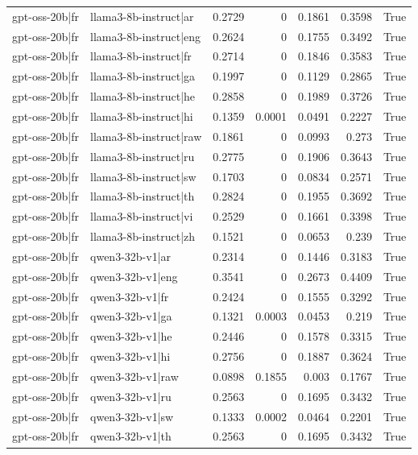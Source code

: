 \begin{table}
\begin{tabular}{l l r r r r l}
gpt-oss-20b|fr & llama3-8b-instruct|ar & 0.2729 & 0 & 0.1861 & 0.3598 & True \\
gpt-oss-20b|fr & llama3-8b-instruct|eng & 0.2624 & 0 & 0.1755 & 0.3492 & True \\
gpt-oss-20b|fr & llama3-8b-instruct|fr & 0.2714 & 0 & 0.1846 & 0.3583 & True \\
gpt-oss-20b|fr & llama3-8b-instruct|ga & 0.1997 & 0 & 0.1129 & 0.2865 & True \\
gpt-oss-20b|fr & llama3-8b-instruct|he & 0.2858 & 0 & 0.1989 & 0.3726 & True \\
gpt-oss-20b|fr & llama3-8b-instruct|hi & 0.1359 & 0.0001 & 0.0491 & 0.2227 & True \\
gpt-oss-20b|fr & llama3-8b-instruct|raw & 0.1861 & 0 & 0.0993 & 0.273 & True \\
gpt-oss-20b|fr & llama3-8b-instruct|ru & 0.2775 & 0 & 0.1906 & 0.3643 & True \\
gpt-oss-20b|fr & llama3-8b-instruct|sw & 0.1703 & 0 & 0.0834 & 0.2571 & True \\
gpt-oss-20b|fr & llama3-8b-instruct|th & 0.2824 & 0 & 0.1955 & 0.3692 & True \\
gpt-oss-20b|fr & llama3-8b-instruct|vi & 0.2529 & 0 & 0.1661 & 0.3398 & True \\
gpt-oss-20b|fr & llama3-8b-instruct|zh & 0.1521 & 0 & 0.0653 & 0.239 & True \\
gpt-oss-20b|fr & qwen3-32b-v1|ar & 0.2314 & 0 & 0.1446 & 0.3183 & True \\
gpt-oss-20b|fr & qwen3-32b-v1|eng & 0.3541 & 0 & 0.2673 & 0.4409 & True \\
gpt-oss-20b|fr & qwen3-32b-v1|fr & 0.2424 & 0 & 0.1555 & 0.3292 & True \\
gpt-oss-20b|fr & qwen3-32b-v1|ga & 0.1321 & 0.0003 & 0.0453 & 0.219 & True \\
gpt-oss-20b|fr & qwen3-32b-v1|he & 0.2446 & 0 & 0.1578 & 0.3315 & True \\
gpt-oss-20b|fr & qwen3-32b-v1|hi & 0.2756 & 0 & 0.1887 & 0.3624 & True \\
gpt-oss-20b|fr & qwen3-32b-v1|raw & 0.0898 & 0.1855 & 0.003 & 0.1767 & True \\
gpt-oss-20b|fr & qwen3-32b-v1|ru & 0.2563 & 0 & 0.1695 & 0.3432 & True \\
gpt-oss-20b|fr & qwen3-32b-v1|sw & 0.1333 & 0.0002 & 0.0464 & 0.2201 & True \\
gpt-oss-20b|fr & qwen3-32b-v1|th & 0.2563 & 0 & 0.1695 & 0.3432 & True \\

\end{tabular}
\end{table}
